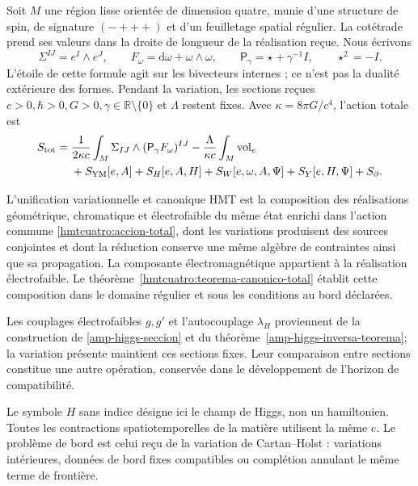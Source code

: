 Soit \(M\) une région lisse orientée de dimension quatre, munie d’une structure de spin, de signature \((-+++)\) et d’un feuilletage spatial régulier. La cotétrade prend ses valeurs dans la droite de longueur de la réalisation reçue. Nous écrivons
\[
 \Sigma^{IJ}=e^I\wedge e^J,\qquad
 F_\omega=\mathrm d\omega+\omega\wedge\omega,\qquad
 \mathsf P_\gamma=\star+\gamma^{-1}I,\qquad \star^2=-I.
\]
L’étoile de cette formule agit sur les bivecteurs internes ; ce n’est pas la dualité extérieure des formes. Pendant la variation, les sections reçues \(c>0,\hbar>0,G>0,\gamma\in\mathbb R\setminus\{0\}\) et \(\Lambda\) restent fixes. Avec \(\kappa=8\pi G/c^4\), l’action totale est
\begin{equation}
 \begin{split}
 S_{\rm tot}={}&\frac1{2\kappa c}
   \int_M\Sigma_{IJ}\wedge(\mathsf P_\gamma F_\omega)^{IJ}
 -\frac{\Lambda}{\kappa c}\int_M\operatorname{vol}_e\\
 &+S_{\rm YM}[e,A]+S_H[e,A,H]
   +S_W[e,\omega,A,\Psi]+S_Y[e,H,\Psi]+S_{\partial}.
 \end{split}
 \label{hmtcuatro:accion-total}
\end{equation}

\begin{definition}
\label{hmtcuatro:def-unificacion}
L’unification variationnelle et canonique HMT est la composition des réalisations géométrique, chromatique et électrofaible du même état enrichi dans l’action commune \eqref{hmtcuatro:accion-total}, dont les variations produisent des sources conjointes et dont la réduction conserve une même algèbre de contraintes ainsi que sa propagation. La composante électromagnétique appartient à la réalisation électrofaible. Le théorème~\ref{hmtcuatro:teorema-canonico-total} établit cette composition dans le domaine régulier et sous les conditions au bord déclarées.
\end{definition}
Les couplages électrofaibles $g,g'$ et l’autocouplage $\lambda_H$ proviennent de la construction de \ref{amp-higgs-seccion} et du théorème~\ref{amp-higgs-inversa-teorema}; la variation présente maintient ces sections fixes. Leur comparaison entre sections constitue une autre opération, conservée dans le développement de l’horizon de compatibilité.


Le symbole \(H\) sans indice désigne ici le champ de Higgs, non un hamiltonien. Toutes les contractions spatiotemporelles de la matière utilisent la même \(e\). Le problème de bord est celui reçu de la variation de Cartan--Holst : variations intérieures, données de bord fixes compatibles ou complétion annulant le même terme de frontière.

